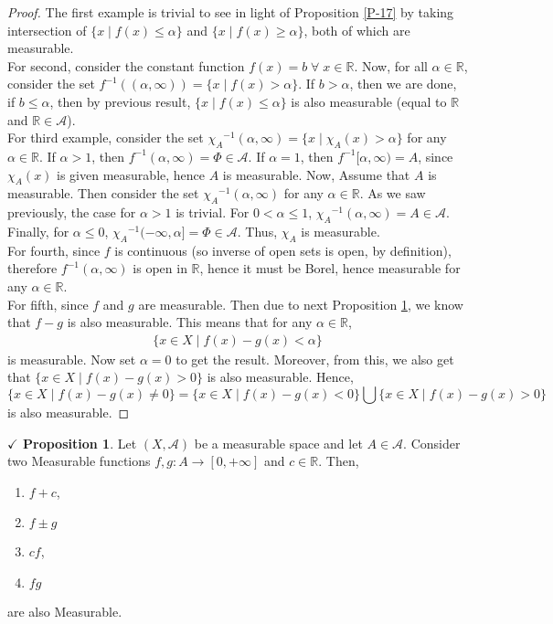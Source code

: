 \documentclass{article}
\theoremstyle{definition}
\theoremstyle{remark}
\theoremstyle{definition}
\theoremstyle{definition}
\newtheorem{proposition}{$\checkmark$ Proposition}
\theoremstyle{definition}
\newcommand{\bunion}{\bigcup}
\newcommand{\where}{\;\vert\;}
\newcommand{\R}{\mathbb{R}}
\newcommand{\alg}[1]{\mathscr{#1}}
\newcommand{\inv}[1]{{#1}^{-1}}
\begin{document}
\begin{proof}
	The first example is trivial to see in light of Proposition \ref{P-17} by taking intersection of $ \{x\where f(x)\le \alpha\} $ and $ \{x\where f(x) \ge \alpha\} $, both of which are measurable.\\
	For second, consider the constant function $ f(x) = b \;\forall \; x \in \R$. Now, for all $ \alpha \in\R $, consider the set $ \inv{f}((\alpha,\infty)) =  \{x\where f(x)>\alpha\}$.  If $ b > \alpha $, then we are done, if $ b\le \alpha $, then by previous result, $ \{x\where f(x) \le \alpha\} $ is also measurable (equal to $ \R $ and $ \R\in \alg{A} $).\\
	For third example, consider the set $ \inv{\chi_A}(\alpha,\infty) = \{x\where \chi_A(x) > \alpha\} $ for any $ \alpha \in \R $. If $ \alpha >1 $, then $ \inv{f}(\alpha,\infty) =  \Phi \in \alg{A}$. If $ \alpha = 1 $, then $\inv{f}[\alpha,\infty) = A$, since $ \chi_A(x) $ is given measurable, hence $ A $ is measurable. Now, Assume that $ A $ is measurable. Then consider the set $ \inv{\chi_A}(\alpha,\infty) $ for any $ \alpha\in \R $. As we saw previously, the case for $ \alpha > 1 $ is trivial. For $ 0< \alpha \le 1 $, $ \inv{\chi_A}(\alpha,\infty) = A \in \alg{A}$. Finally, for $ \alpha\le 0 $, $ \inv{\chi_A} (-\infty,\alpha]  = \Phi \in \alg{A}$. Thus, $ \chi_A $ is measurable.\\
	For fourth, since $ f $ is continuous (so inverse of open sets is open, by definition), therefore $ \inv{f} (\alpha,\infty) $ is open in $ \R $, hence it must be Borel, hence measurable for any $ \alpha \in \R $.\\
	For fifth, since $ f $ and $ g $ are measurable. Then due to next Proposition \ref{P-19}, we know that $ f-g $ is also measurable. This means that for any $ \alpha \in \R $,
	\begin{equation*}
		\begin{split}
			\{x\in X\where f(x)-g(x) < \alpha\}
		\end{split}
	\end{equation*}
is measurable. Now set $ \alpha = 0 $ to get the result. Moreover, from this, we also get that $ \{x\in X\where f(x) -g(x) >0\} $ is also measurable. Hence,
\[\{x\in X \where f(x)-g(x)\neq 0\} = \{x\in X\where f(x)- g(x) < 0\} \bunion \{x\in X \where f(x)-g(x) > 0\}\]
is also measurable.
\end{proof}
\hrulefill
\begin{proposition} \label{P-19}
	Let $ (X,\alg{A}) $ be a measurable space and let $ A \in \alg{A}$. Consider two Measurable functions $ f,g : A \longrightarrow [0,+\infty] $ and $ c\in \R $. Then,
	\begin{enumerate}
		\item {$ f+ c $,}
		\item {$ f\pm g $}
		\item {$ cf $,}
		\item {$ fg $}
	\end{enumerate}
are also Measurable.
\end{proposition}
\end{document}
